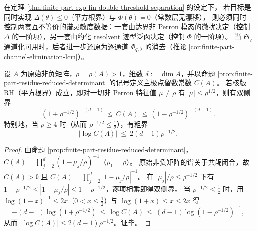 \begin{corollary}\label{cor:finite-part-double-threshold-design-principle}
在定理 \ref{thm:finite-part-exp-fin-double-threshold-separation} 的设定下，
若目标是同时实现 \(\Delta(\theta)\le 0\)（平方根界）与 \(\Phi(\theta)=0\)（常数层无漂移），
则必须同时控制两套互不等价的谱灵敏度数据：一套由达界非 Perron 模态的微扰决定（控制 \(\Delta\) 的一阶项），另一套由约化 resolvent 迹型泛函决定（控制 \(\Phi\) 的一阶项）。
当 \(\mathfrak{S}_q\) 通道化可用时，后者进一步还原为逐通道 \(\Phi_{q,\lambda}\) 的消去（推论 \ref{cor:finite-part-channel-elimination-lcm}）。
\end{corollary}

\begin{proposition}\label{prop:finite-part-residue-constant-rh-squeeze}
设 \(A\) 为原始非负矩阵，\(\rho=\rho(A)>1\)，维数 \(d:=\dim A\)，并以命题 \ref{prop:finite-part-residue-reduced-determinant} 的记号定义主极点留数常数 \(C(A)\)。
若核版 RH（平方根界）成立，即对一切非 Perron 特征值 \(\mu\neq\rho\) 有 \(|\mu|\le \rho^{1/2}\)，则有双侧界
\[
(1+\rho^{-1/2})^{-(d-1)}\ \le\ C(A)\ \le\ (1-\rho^{-1/2})^{-(d-1)}.
\]
特别地，当 \(\rho\ge 4\) 时（从而 \(\rho^{-1/2}\le \tfrac12\)），有粗界
\[
|\log C(A)|\ \le\ 2(d-1)\rho^{-1/2}.
\]
\end{proposition}

\begin{proof}
由命题 \ref{prop:finite-part-residue-reduced-determinant}，
\(
C(A)=\prod_{j=2}^{d}(1-\mu_j/\rho)^{-1}
\)（\(\mu_1=\rho\)）。
原始非负矩阵的谱关于共轭闭合，故 \(C(A)>0\) 且
\(
C(A)=\prod_{j=2}^{d}|1-\mu_j/\rho|^{-1}
\)。
在 \(|\mu_j|/\rho\le \rho^{-1/2}\) 下有
\(
1-\rho^{-1/2}\le |1-\mu_j/\rho|\le 1+\rho^{-1/2}
\)，逐项相乘即得双侧界。
当 \(\rho^{-1/2}\le\tfrac12\) 时，用 \(\log(1-x)^{-1}\le 2x\)（\(0<x\le\tfrac12\)）与 \(\log(1+x)\le x\le 2x\) 得
\[
-(d-1)\log(1+\rho^{-1/2})
\ \le\ \log C(A)\ \le\ (d-1)\log(1-\rho^{-1/2})^{-1},
\]
从而 \(|\log C(A)|\le 2(d-1)\rho^{-1/2}\)。证毕。
\end{proof}

